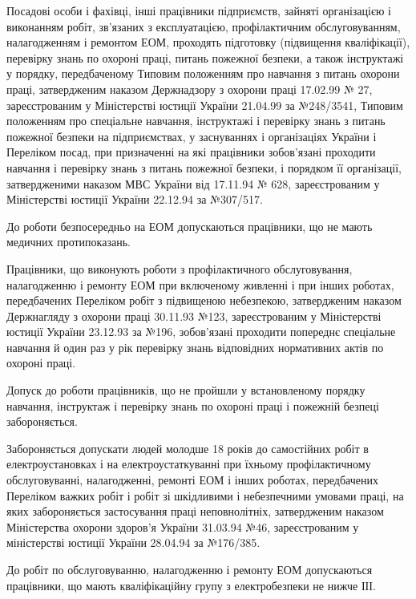 \documentclass[simple,a4paper,14pt,ukrainian,utf8]{eskdtext}
\begin{document}
\begin{appendices}
                Посадові особи і фахівці, інші працівники підприємств, зайняті організацією і виконанням робіт, зв'язаних з експлуатацією, профілактичним обслуговуванням, налагодженням і ремонтом ЕОМ, проходять підготовку (підвищення кваліфікації), перевірку знань по охороні праці, питань пожежної безпеки, а також інструктажі у порядку, передбаченому Типовим положенням про навчання з питань охорони праці, затвердженим наказом Держнадзору з охорони праці 17.02.99 № 27, зареєстрованим у Міністерстві юстиції України 21.04.99 за №248/3541, Типовим положенням про спеціальне навчання, інструктажі і перевірку знань з питань пожежної безпеки на підприємствах, у заснуваннях і організаціях України і Переліком посад, при призначенні на які працівники зобов'язані проходити навчання і перевірку знань з питань пожежної безпеки, і порядком її організації, затвердженими наказом МВС України від 17.11.94 № 628, зареєстрованим у Міністерстві юстиції України 22.12.94 за №307/517.

                До роботи безпосередньо на ЕОМ допускаються працівники, що не мають медичних протипоказань.

                Працівники, що виконують роботи з профілактичного обслуговування, налагодженню і ремонту ЕОМ при включеному живленні і при інших роботах, передбачених Переліком робіт з підвищеною небезпекою, затвердженим наказом Держнагляду з охорони праці 30.11.93 №123, зареєстрованим у Міністерстві юстиції України 23.12.93 за №196, зобов'язані проходити попереднє спеціальне навчання й один раз у рік перевірку знань відповідних нормативних актів по охороні праці.

                Допуск до роботи працівників, що не пройшли у встановленому порядку навчання, інструктаж і перевірку знань по охороні праці і пожежній безпеці забороняється.

                Забороняється допускати людей молодше 18 років до самостійних робіт в електроустановках і на електроустаткуванні при їхньому профілактичному обслуговуванні, налагодженні, ремонті ЕОМ і інших роботах, передбачених Переліком важких робіт і робіт зі шкідливими і небезпечними умовами праці, на яких забороняється застосування праці неповнолітніх, затвердженим наказом Міністерства охорони здоров'я України 31.03.94 №46, зареєстрованим у міністерстві юстиції України 28.04.94 за №176/385.

                До робіт по обслуговуванню, налагодженню і ремонту ЕОМ допускаються працівники, що мають кваліфікаційну групу з електробезпеки не нижче ІІІ.


\end{appendices}
\end{document}
